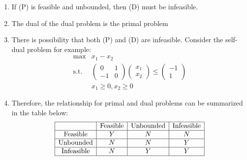 \begin{remark}
\begin{enumerate}
\item
If (P) is feasible and unbounded, then (D) must be infeasible.
\item
The dual of the dual problem is the primal problem
\item
There is possibility that both (P) and (D) are infeasible. Consider the self-dual problem for example:
\[
\begin{array}{ll}
\max&x_1-x_2\\
\text{s.t.}&\begin{pmatrix}
0&1\\-1&0
\end{pmatrix}\begin{pmatrix}
x_1\\x_2
\end{pmatrix}\le\begin{pmatrix}
-1\\1
\end{pmatrix}\\
&x_1\ge0,x_2\ge0
\end{array}
\]
\item
Therefore, the relationship for primal and dual problems can be summarized in the table below:
\[
\begin{array}{|c|c|c|c|}
\hline
&\text{Feasible}&\text{Unbounded}&\text{Infeasible}\\\hline
\text{Feasible}&Y&N&N\\\hline
\text{Unbounded}&N&N&Y\\\hline
\text{Infeasible}&N&Y&Y\\\hline
\end{array}
\]
\end{enumerate}
\end{remark}















